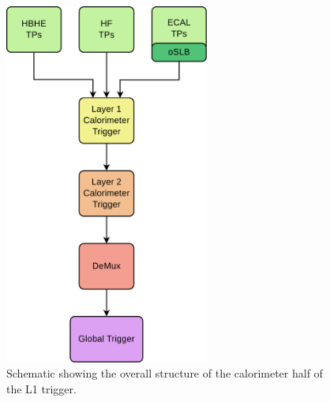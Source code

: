 \begin{figure}[h]
\begin{center}
\includegraphics[width=0.6\textwidth]{Figures/Trigger/caloL1T.pdf}
\end{center}
\caption{Schematic showing the overall structure of the calorimeter half of the L1 trigger.}
\label{fig:caloL1T}
\end{figure}

